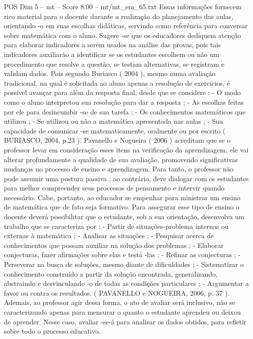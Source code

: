 \begin{textsample}{POS Dim 5 – mt – Score 8.00 – mt/mt\_em\_65.txt}
Essas informações fornecem rico material para o docente durante a realização do planejamento das aulas, orientando -o em suas escolhas didáticas, servindo como referência para conversar sobre matemática com o aluno.
Sugere -se que os educadores dediquem atenção para elaborar indicadores a serem usados na análise das provas, pois tais indicadores auxiliarão a identificar se os estudantes escolhem ou não um procedimento que resolve a questão, se testam alternativas, se registram e validam dados.
Pois segundo Buriasco ( 2004 ), mesmo numa avaliação tradicional, na qual é solicitada ao aluno apenas a resolução de exercícios, é possível avançar para além da resposta final, desde que se considere : - O modo como o aluno interpretou sua resolução para dar a resposta ; - As escolhas feitas por ele para desincumbir -se de sua tarefa ; - Os conhecimentos matemáticos que utilizou ; - Se utilizou ou não a matemática apresentada nas aulas ; - Sua capacidade de comunicar -se matematicamente, oralmente ou por escrito ( BURIASCO, 2004, p.23 ).
Pavanello e Nogueira ( 2006 ) acreditam que se o professor levar em consideração esses itens na verificação da aprendizagem, ele vai alterar profundamente a qualidade de sua avaliação, promovendo significativas mudanças no processo de ensino e aprendizagem.
Para tanto, o professor não pode assumir uma postura passiva ; ao contrário, deve dialogar com os estudantes para melhor compreender seus processos de pensamento e intervir quando necessário.
Cabe, portanto, ao educador se empenhar para ministrar um ensino de matemática que de fato seja formativo.
Para assegurar esse tipo de ensino o docente deverá possibilitar que o estudante, sob a sua orientação, desenvolva um trabalho que se caracteriza por : - Partir de situações-problema internas ou externas à matemática ; - Analisar as situações ; - Pesquisar acerca de conhecimentos que possam auxiliar na solução dos problemas ; - Elaborar conjecturas, fazer afirmações sobre elas e testá -las ; - Refinar as conjecturas ; - Perseverar na busca de soluções, mesmo diante de dificuldades ; - Sistematizar o conhecimento construído a partir da solução encontrada, generalizando, abstraindo e desvinculando -o de todas as condições particulares ; - Argumentar a favor ou contra os resultados. ( PAVANELLO e NOGUEIRA, 2006, p. 37 ).
Ademais, ao professor agir dessa forma, o ato de avaliar será inclusivo, não se caracterizando apenas para mensurar o quanto o estudante aprendeu ou deixou de aprender.
Nesse caso, avaliar -se-á para analisar os dados obtidos, para refletir sobre todo o processo educativo.

\end{textsample}
